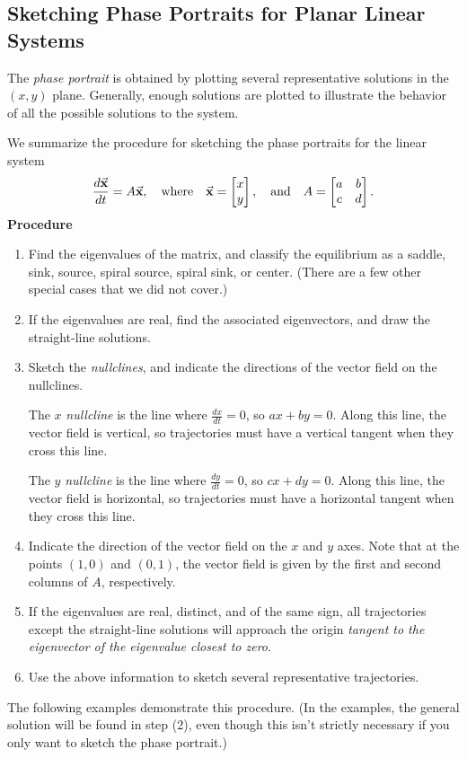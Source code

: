 \subsection*{Sketching Phase Portraits for Planar Linear Systems}

\noindent
The \emph{phase portrait} is obtained by plotting several
representative solutions in the $(x,y)$ plane.
Generally, enough solutions are plotted to illustrate
the behavior of all the possible solutions to the system.

We summarize the procedure for sketching the phase portraits for
the linear system
\[
    \frac{d\vec{\textbf{x}}}{dt} = A\vec{\textbf{x}}, \quad \textrm{where} \quad
    \vec{\textbf{x}}=\begin{bmatrix} x \\ y \end{bmatrix},
    \quad \textrm{and} \quad
    A = \begin{bmatrix} a & b \\ c & d \end{bmatrix}.
\]
\noindent
\textbf{Procedure}
\begin{enumerate}
\item
Find the eigenvalues of the matrix, and classify the equilibrium as a
saddle, sink, source, spiral source, spiral sink, or center.
(There are a few other special cases that we did not cover.)
\item
If the eigenvalues are real, find the associated eigenvectors, and
draw the straight-line solutions.
\item  Sketch the \emph{nullclines}, and indicate the
directions of the vector field on the nullclines.

The $x$ \emph{nullcline} is the line where $\frac{dx}{dt}=0$,
so $ax+by=0$. Along this line, the vector field is vertical, so trajectories
must have a vertical tangent when they cross this line.

The $y$ \emph{nullcline} is the line where $\frac{dy}{dt}=0$, so
$cx+dy=0$.  Along this line, the vector field is horizontal, so
trajectories must have a horizontal tangent when they cross this line.
 
\item Indicate the direction of the vector field on the $x$ and $y$ axes.
Note that at the points $(1,0)$ and $(0,1)$, the
vector field is given by the first and second columns of $A$, respectively.
\item
If the eigenvalues are real, distinct, and of the same sign,
all trajectories except the straight-line solutions
will approach the origin \emph{tangent to the eigenvector
of the eigenvalue closest to zero}.
\item Use the above information to sketch several representative trajectories.
\end{enumerate}
The following examples demonstrate this procedure.
(In the examples, the general solution will be found in step (2),
even though this isn't strictly necessary if you only want to
sketch the phase portrait.)
\newpage

